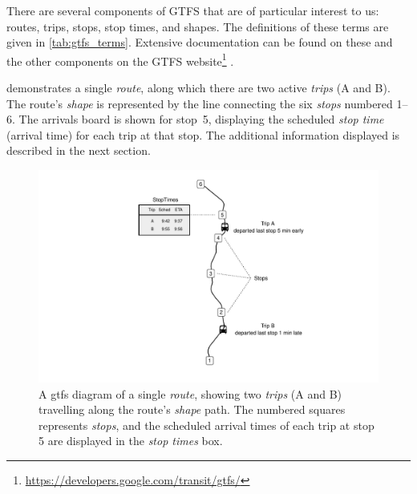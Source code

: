 There are several components of GTFS that are of particular interest to us: routes, trips, stops, stop times, and shapes. The definitions of these terms are given in \cref{tab:gtfs_terms}. Extensive documentation can be found on these and the other components on the GTFS website\footnote{\url{https://developers.google.com/transit/gtfs/}} \citep{GoogleDevelopers_2006}.


 demonstrates a single \emph{route}, along which there are two active \emph{trips} (A and B). The route's \emph{shape} is represented by the line connecting the six \emph{stops} numbered 1--6. The \rt{} arrivals board is shown for stop~5, displaying the scheduled \emph{stop time} (arrival time) for each trip at that stop. The additional information displayed is described in the next section.



\begin{knitrout}\small
{}\color{fgcolor}\begin{figure}

{\centering \includegraphics[width=\textwidth]{figure/gtfs_nw-1} 

}

\caption{A \gls{gtfs} diagram of a single \emph{route}, showing two \emph{trips} (A and B) travelling along the route's \emph{shape} path. The numbered squares represents \emph{stops}, and the scheduled arrival times of each trip at stop 5 are displayed in the \emph{stop times} box.}\label{fig:gtfs_nw}
\end{figure}


\end{knitrout}

\begin{knitrout}\small
{}\color{fgcolor}\begin{kframe}


{\ttfamily\noindent\itshape\color{messagecolor}{\#\# Loading required namespace: transitr}}\end{kframe}
\end{knitrout}

